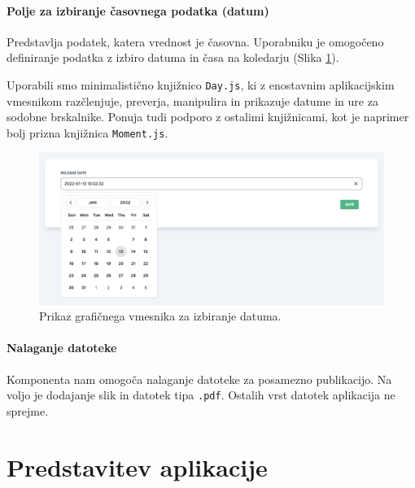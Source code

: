 \documentclass[a4paper, 12pt]{book}
\begin{document}
\subsubsection{Polje za izbiranje časovnega podatka (datum)}
Predstavlja podatek, katera vrednost je časovna. Uporabniku je omogočeno definiranje podatka z izbiro datuma in časa na koledarju (Slika \ref{type-date}). 

Uporabili smo minimalistično knjižnico \verb=Day.js=, ki z enostavnim aplikacijskim vmesnikom razčlenjuje, preverja, manipulira in prikazuje datume in ure za sodobne brskalnike. Ponuja tudi podporo z ostalimi knjižnicami, kot je naprimer bolj prizna knjižnica \verb=Moment.js=.


\begin{figure}[h]
\begin{center}
\includegraphics[width=1\textwidth]{slike/type_date.png}
\end{center}
\caption{ Prikaz grafičnega vmesnika za izbiranje datuma. }
\label{type-date}
\end{figure}

\subsubsection{Nalaganje datoteke}
Komponenta nam omogoča nalaganje datoteke za posamezno publikacijo. Na voljo je dodajanje slik in datotek tipa \verb=.pdf=. Ostalih vrst datotek aplikacija ne sprejme.

\chapter{Predstavitev aplikacije}
\end{document}
